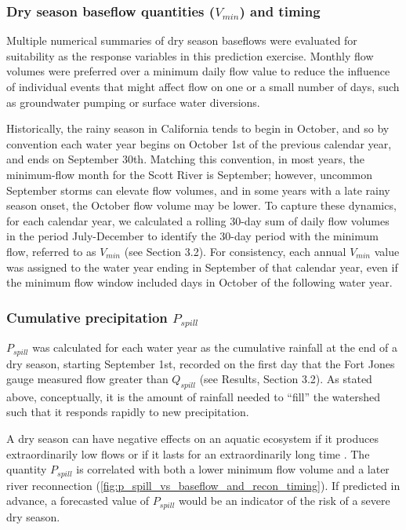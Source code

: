 \documentclass[hess, manuscript]{copernicus}
\begin{document}
\subsubsection{\texorpdfstring{Dry season baseflow quantities
(\(V_{min}\)) and
timing}{Dry season baseflow quantities (V\_\{min\}) and timing}}

Multiple numerical summaries of dry season baseflows were evaluated for
suitability as the response variables in this prediction exercise.
Monthly flow volumes were preferred over a minimum daily flow value to
reduce the influence of individual events that might affect flow on one
or a small number of days, such as groundwater pumping or surface water
diversions.

Historically, the rainy season in California tends to begin in October,
and so by convention each water year begins on October 1st of the
previous calendar year, and ends on September 30th. Matching this
convention, in most years, the minimum-flow month for the Scott River is
September; however, uncommon September storms can elevate flow volumes,
and in some years with a late rainy season onset, the October flow
volume may be lower. To capture these dynamics, for each calendar year,
we calculated a rolling 30-day sum of daily flow volumes in the period
July-December to identify the 30-day period with the minimum flow,
referred to as \(V_{min}\) (see Section 3.2). For consistency, each
annual \(V_{min}\) value was assigned to the water year ending in
September of that calendar year, even if the minimum flow window
included days in October of the following water year.

\subsubsection{\texorpdfstring{Cumulative precipitation
\(P_{spill}\)}{Cumulative precipitation P\_\{spill\}}}

\(P_{spill}\) was calculated for each water year as the cumulative
rainfall at the end of a dry season, starting September 1st, recorded on
the first day that the Fort Jones gauge measured flow greater than
\(Q_{spill}\) (see Results, Section 3.2). As stated above, conceptually,
it is the amount of rainfall needed to ``fill'' the watershed such that
it responds rapidly to new precipitation.

A dry season can have negative effects on an aquatic ecosystem if it
produces extraordinarily low flows or if it lasts for an extraordinarily
long time \citeyearpar[e.g., delayed salmon habitat access documented in
CDFW][]{CDFW2015a}. The quantity \(P_{spill}\) is correlated with both a
lower minimum flow volume and a later river reconnection
(\autoref{fig:p_spill_vs_baseflow_and_recon_timing}). If predicted in
advance, a forecasted value of \(P_{spill}\) would be an indicator of
the risk of a severe dry season.
\end{document}
